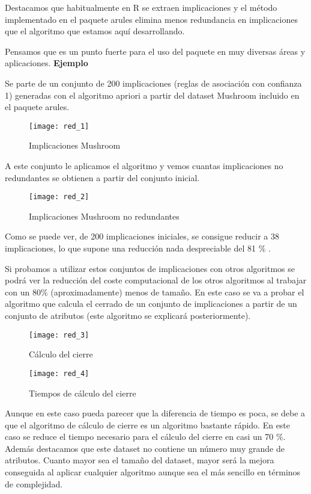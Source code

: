 Destacamos que habitualmente en R se extraen implicaciones y el m\'etodo implementado en el paquete arules elimina menos redundancia en implicaciones que el algoritmo que estamos aqu\'i desarrollando. 

Pensamos que es un punto fuerte para el uso del paquete en muy diversas \'areas y aplicaciones. 
\newpage
\textbf{Ejemplo}

Se parte de un conjunto de 200 implicaciones (reglas de asociaci\'on con confianza 1) generadas con el algoritmo apriori a partir del dataset Mushroom incluido en el paquete arules.

\begin{figure}[H]
    \centering
    \texttt{[image: red\_1]}
    \caption{Implicaciones Mushroom}
    \label{fig:red_1}
\end{figure} 
\newpage
A este conjunto le aplicamos el algoritmo y vemos cuantas implicaciones no redundantes se obtienen a partir del conjunto inicial.

\begin{figure}[H]
    \centering
    \texttt{[image: red\_2]}
    \caption{Implicaciones Mushroom no redundantes}
    \label{fig:red_2}
\end{figure} 

Como se puede ver, de 200 implicaciones iniciales, se consigue reducir a 38 implicaciones, lo que supone una reducci\'on nada despreciable del 81 \% .

Si probamos a utilizar estos conjuntos de implicaciones con otros algoritmos se podr\'a ver la reducci\'on del coste computacional de los otros algoritmos al trabajar con un 80\% (aproximadamente) menos de tama\~no. En este caso se va a probar el algoritmo que calcula el cerrado de un conjunto de implicaciones a partir de un conjunto de atributos (este algoritmo se explicar\'a posteriormente).

\begin{figure}[H]
    \centering
    \texttt{[image: red\_3]}
    \caption{C\'alculo del cierre}
    \label{fig:red_3}
\end{figure}

\begin{figure}[H]
    \centering
    \texttt{[image: red\_4]}
    \caption{Tiempos de c\'alculo del cierre}
    \label{fig:red_4}
\end{figure}

Aunque en este caso pueda parecer que la diferencia de tiempo es poca, se debe a que el algoritmo de c\'alculo de cierre es un algoritmo bastante r\'apido. En este caso se reduce el tiempo necesario para el c\'alculo del cierre en casi un 70 \%. Adem\'as destacamos que este dataset no contiene un n\'umero muy grande de atributos. Cuanto mayor sea el tama\~no del dataset, mayor ser\'a la mejora conseguida al aplicar cualquier algoritmo aunque sea el m\'as sencillo en t\'erminos de complejidad. 

